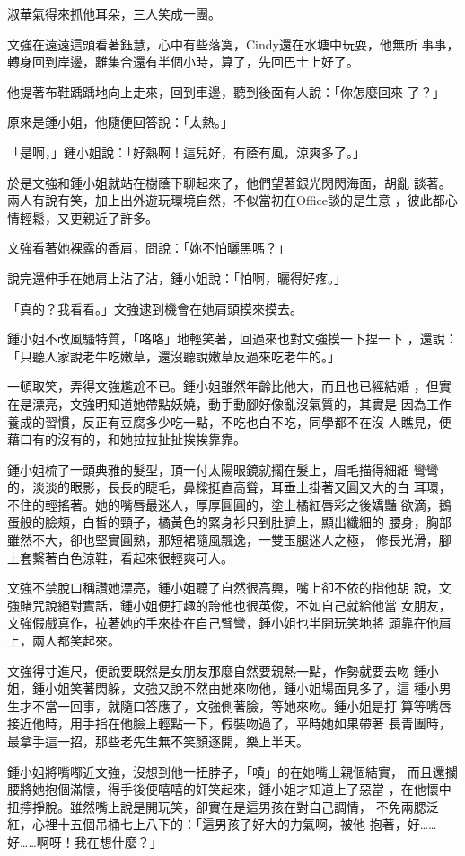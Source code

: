 淑華氣得來抓他耳朵，三人笑成一團。

文強在遠遠這頭看著鈺慧，心中有些落寞，Cindy還在水塘中玩耍，他無所
事事，轉身回到岸邊，離集合還有半個小時，算了，先回巴士上好了。

他提著布鞋踽踽地向上走來，回到車邊，聽到後面有人說：「你怎麼回來
了？」

原來是鍾小姐，他隨便回答說：「太熱。」

「是啊，」鍾小姐說：「好熱啊！這兒好，有蔭有風，涼爽多了。」

於是文強和鍾小姐就站在樹蔭下聊起來了，他們望著銀光閃閃海面，胡亂
談著。兩人有說有笑，加上出外遊玩環境自然，不似當初在Office談的是生意
，彼此都心情輕鬆，又更親近了許多。

文強看著她裸露的香肩，問說：「妳不怕曬黑嗎？」

說完還伸手在她肩上沾了沾，鍾小姐說：「怕啊，曬得好疼。」

「真的？我看看。」文強逮到機會在她肩頭摸來摸去。

鍾小姐不改風騷特質，「咯咯」地輕笑著，回過來也對文強摸一下捏一下
，還說：「只聽人家說老牛吃嫩草，還沒聽說嫩草反過來吃老牛的。」

一頓取笑，弄得文強尷尬不已。鍾小姐雖然年齡比他大，而且也已經結婚
，但實在是漂亮，文強明知道她帶點妖嬈，動手動腳好像亂沒氣質的，其實是
因為工作養成的習慣，反正有豆腐多少吃一點，不吃也白不吃，同學都不在沒
人瞧見，便藉口有的沒有的，和她拉拉扯扯挨挨靠靠。

鍾小姐梳了一頭典雅的髮型，頂一付太陽眼鏡就擱在髮上，眉毛描得細細
彎彎的，淡淡的眼影，長長的睫毛，鼻樑挺直高聳，耳垂上掛著又圓又大的白
耳環，不住的輕搖著。她的嘴唇最迷人，厚厚圓圓的，塗上橘紅唇彩之後嬌豔
欲滴，鵝蛋般的臉頰，白皙的頸子，橘黃色的緊身衫只到肚臍上，顯出纖細的
腰身，胸部雖然不大，卻也堅實圓熟，那短裙隨風飄逸，一雙玉腿迷人之極，
修長光滑，腳上套繫著白色涼鞋，看起來很輕爽可人。

文強不禁脫口稱讚她漂亮，鍾小姐聽了自然很高興，嘴上卻不依的指他胡
說，文強賭咒說絕對實話，鍾小姐便打趣的誇他也很英俊，不如自己就給他當
女朋友，文強假戲真作，拉著她的手來掛在自己臂彎，鍾小姐也半開玩笑地將
頭靠在他肩上，兩人都笑起來。

文強得寸進尺，便說要既然是女朋友那麼自然要親熱一點，作勢就要去吻
鍾小姐，鍾小姐笑著閃躲，文強又說不然由她來吻他，鍾小姐場面見多了，這
種小男生才不當一回事，就隨口答應了，文強側著臉，等她來吻。鍾小姐是打
算等嘴唇接近他時，用手指在他臉上輕點一下，假裝吻過了，平時她如果帶著
長青團時，最拿手這一招，那些老先生無不笑顏逐開，樂上半天。

鍾小姐將嘴嘟近文強，沒想到他一扭脖子，「嘖」的在她嘴上親個結實，
而且還攔腰將她抱個滿懷，得手後便嘻嘻的奸笑起來，鍾小姐才知道上了惡當
，在他懷中扭擰掙脫。雖然嘴上說是開玩笑，卻實在是這男孩在對自己調情，
不免兩腮泛紅，心裡十五個吊桶七上八下的：「這男孩子好大的力氣啊，被他
抱著，好……好……啊呀！我在想什麼？」

